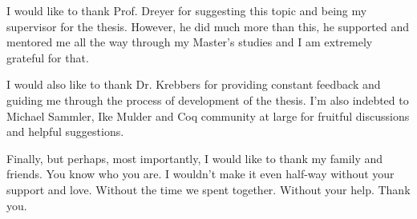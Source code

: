 I would like to thank Prof. Dreyer for suggesting this topic and being my supervisor for the thesis.
However, he did much more than this, he supported and mentored me all the way through my Master's studies and I am extremely grateful for that.

I would also like to thank Dr. Krebbers for providing constant feedback and guiding me through the process of development of the thesis.
I'm also indebted to Michael Sammler, Ike Mulder and Coq community at large for fruitful discussions and helpful suggestions.

Finally, but perhaps, most importantly, I would like to thank my family and friends.
You know who you are.
I wouldn't make it even half-way without your support and love.
Without the time we spent together.
Without your help.
Thank you.


